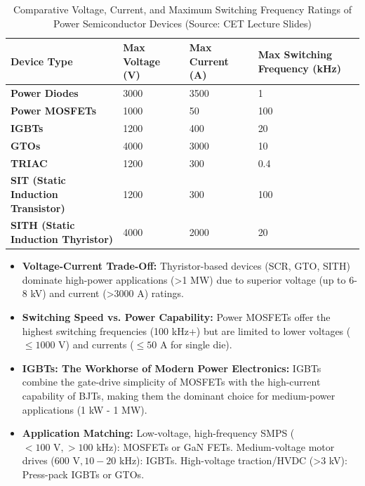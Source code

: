 \documentclass[11pt,a4paper]{article}
\begin{document}
\begin{table}[htbp]
\centering
\small
\caption{Comparative Voltage, Current, and Maximum Switching Frequency Ratings of Power Semiconductor Devices (Source: CET Lecture Slides)}
\label{tab:device_ratings_comparison}
\begin{tabularx}{\textwidth}{l Y Y Y}
\toprule
\textbf{Device Type} & \textbf{Max Voltage (V)} & \textbf{Max Current (A)} & \textbf{Max Switching Frequency (kHz)} \\
\midrule
\textbf{Power Diodes} & 3000 & 3500 & 1 \\
\textbf{Power MOSFETs} & 1000 & 50 & 100 \\
\textbf{IGBTs} & 1200 & 400 & 20 \\
\textbf{GTOs} & 4000 & 3000 & 10 \\
\textbf{TRIAC} & 1200 & 300 & 0.4 \\
\textbf{SIT (Static Induction Transistor)} & 1200 & 300 & 100 \\
\textbf{SITH (Static Induction Thyristor)} & 4000 & 2000 & 20 \\
\bottomrule
\end{tabularx}
\end{table}

\begin{conceptbox}
\begin{itemize}[leftmargin=*]
  \item \textbf{Voltage-Current Trade-Off:} Thyristor-based devices (SCR, GTO, SITH) dominate high-power applications (>1 MW) due to superior voltage (up to 6-8 kV) and current (>3000 A) ratings.
  \item \textbf{Switching Speed vs. Power Capability:} Power MOSFETs offer the highest switching frequencies (100 kHz+) but are limited to lower voltages ($\le 1000\text{ V}$) and currents ($\le 50\text{ A}$ for single die).
  \item \textbf{IGBTs: The Workhorse of Modern Power Electronics:} IGBTs combine the gate-drive simplicity of MOSFETs with the high-current capability of BJTs, making them the dominant choice for medium-power applications (1 kW - 1 MW).
  \item \textbf{Application Matching:} Low-voltage, high-frequency SMPS ($< 100\text{ V}, > 100\text{ kHz}$): MOSFETs or GaN FETs. Medium-voltage motor drives ($600\text{ V}, 10-20\text{ kHz}$): IGBTs. High-voltage traction/HVDC (>3 kV): Press-pack IGBTs or GTOs.
\end{itemize}
\end{conceptbox}
\end{document}
